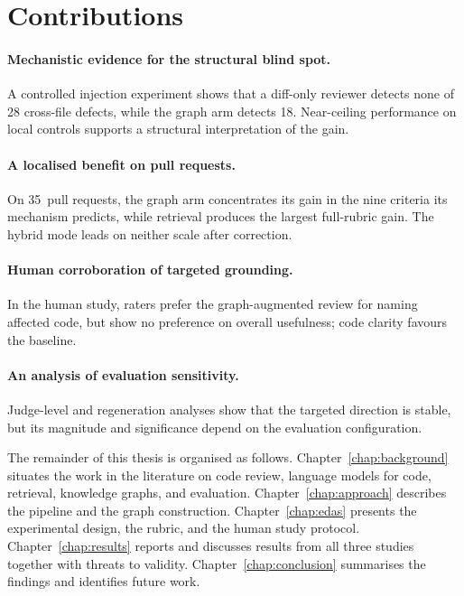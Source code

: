 \section{Contributions}
\label{sec:intro-contributions}

\paragraph{Mechanistic evidence for the structural blind spot.}
A controlled injection experiment shows that a diff-only reviewer detects none
of 28 cross-file defects, while the graph arm detects 18. Near-ceiling
performance on local controls supports a structural interpretation of the gain.

\paragraph{A localised benefit on pull requests.}
On 35~pull requests, the graph arm concentrates its gain in
the nine criteria its mechanism predicts, while retrieval produces the largest
full-rubric gain. The hybrid mode leads on neither scale after correction.

\paragraph{Human corroboration of targeted grounding.}
In the human study, raters prefer the graph-augmented review for naming
affected code, but show no preference on overall usefulness; code clarity
favours the baseline.

\paragraph{An analysis of evaluation sensitivity.}
Judge-level and regeneration analyses show that the targeted direction is
stable, but its magnitude and significance depend on the evaluation
configuration.

\medskip\noindent
The remainder of this thesis is organised as follows.
Chapter~\ref{chap:background} situates the work in the literature on code
review, language models for code, retrieval, knowledge graphs, and evaluation.
Chapter~\ref{chap:approach} describes the pipeline and the graph
construction. Chapter~\ref{chap:edas} presents the experimental design, the
rubric, and the human study protocol. Chapter~\ref{chap:results} reports and
discusses results from all three studies together with threats to validity.
Chapter~\ref{chap:conclusion} summarises the findings and identifies future
work.
